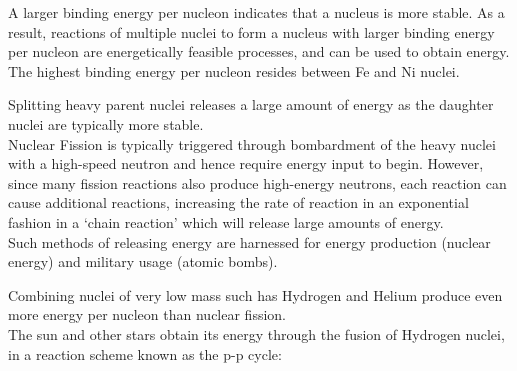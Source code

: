 \documentclass[../main]{subfiles}
\begin{document}

	A larger binding energy per nucleon indicates that a nucleus is more stable. As a result, reactions of multiple nuclei to form a nucleus with larger binding energy per nucleon are energetically feasible processes, and can be used to obtain energy. \\

	The highest binding energy per nucleon resides between Fe and Ni nuclei. \\



	Splitting heavy parent nuclei releases a large amount of energy as the daughter nuclei are typically more stable. \\

	Nuclear Fission is typically triggered through bombardment of the heavy nuclei with a high-speed neutron and hence require energy input to begin. However, since many fission reactions also produce high-energy neutrons, each reaction can cause additional reactions, increasing the rate of reaction in an exponential fashion in a `chain reaction' which will release large amounts of energy. \\

	Such methods of releasing energy are harnessed for energy production (nuclear energy) and military usage (atomic bombs). \\


	Combining nuclei of very low mass such has Hydrogen and Helium produce even more energy per nucleon than nuclear fission. \\

	The sun and other stars obtain its energy through the fusion of Hydrogen nuclei, in a reaction scheme known as the p-p cycle:
\end{document}
